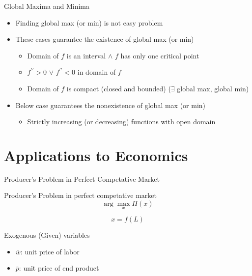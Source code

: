 \documentclass[final]{beamer}
\begin{document}
\begin{frame}[t]{Global Maxima and Minima}
	\begin{itemize}
		\item Finding global max (or min) is not easy problem
		\item These cases guarantee the existence of global max (or min)
		\begin{itemize}
			\item Domain of $f$ is an interval $\land$ $f$ has only one critical point
			\item $f^{\prime\prime}>0$ $\lor$ $f^{\prime\prime}<0$ in domain of $f$
			\item Domain of $f$ is compact (closed and bounded)    ($\exists$ global max, global min)
		\end{itemize}
		\item Below case guarantees the nonexistence of global max (or min)
		\begin{itemize}
			\item Strictly increasing (or decreasing) functions with open domain
		\end{itemize}
	\end{itemize}
\end{frame}

\section{Applications to Economics} %
\label{sec:applications_to_economics}
\begin{frame}[t]{Producer's Problem in Perfect Competative Market}
	
	\begin{block}
		{Producer's Problem in perfect competative market}
		\[
			\arg\max_x \Pi(x)
		\]
	\end{block}
	\[
		x=f(L) \tag{Production Function}
	\]
	\begin{block}
		{Exogenous (Given) variables}
		\begin{itemize}
			\item $\bar w$: unit price of labor
			\item $\bar p$: unit price of end product
		\end{itemize}
	\end{block}
\end{frame}
\end{document}
